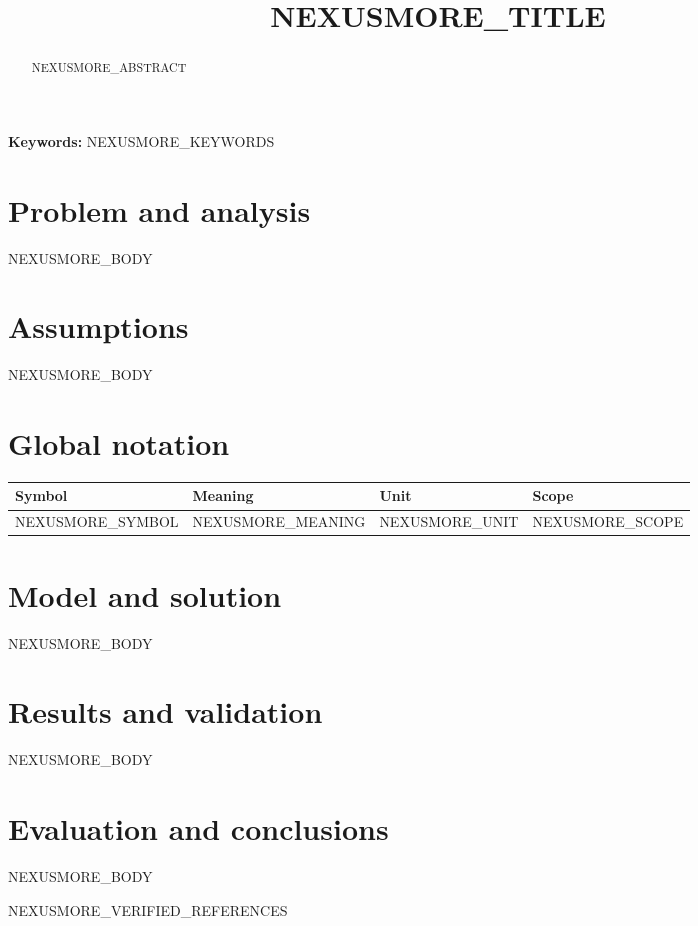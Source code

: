 \documentclass[12pt,a4paper]{article}
\title{NEXUSMORE_TITLE}
\author{}
\date{}
\begin{document}
\maketitle
\begin{abstract}
NEXUSMORE_ABSTRACT
\end{abstract}
\noindent\textbf{Keywords: }NEXUSMORE_KEYWORDS
\clearpage
\section{Problem and analysis}
NEXUSMORE_BODY
\section{Assumptions}
NEXUSMORE_BODY
\section{Global notation}
\begin{longtable}{llll}
\toprule Symbol & Meaning & Unit & Scope \\ \midrule
NEXUSMORE_SYMBOL & NEXUSMORE_MEANING & NEXUSMORE_UNIT & NEXUSMORE_SCOPE \\
\bottomrule
\end{longtable}
\section{Model and solution}
NEXUSMORE_BODY
\section{Results and validation}
NEXUSMORE_BODY
\section{Evaluation and conclusions}
NEXUSMORE_BODY
\begin{thebibliography}{99}
NEXUSMORE_VERIFIED_REFERENCES
\end{thebibliography}
\end{document}
